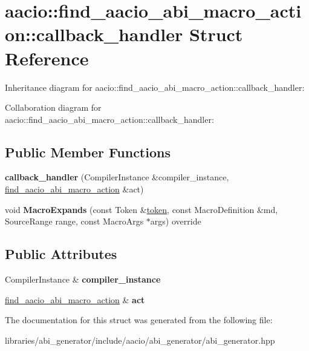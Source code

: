 \hypertarget{structaacio_1_1find__aacio__abi__macro__action_1_1callback__handler}{}\section{aacio\+:\+:find\+\_\+aacio\+\_\+abi\+\_\+macro\+\_\+action\+:\+:callback\+\_\+handler Struct Reference}
\label{structaacio_1_1find__aacio__abi__macro__action_1_1callback__handler}


Inheritance diagram for aacio\+:\+:find\+\_\+aacio\+\_\+abi\+\_\+macro\+\_\+action\+:\+:callback\+\_\+handler\+:


Collaboration diagram for aacio\+:\+:find\+\_\+aacio\+\_\+abi\+\_\+macro\+\_\+action\+:\+:callback\+\_\+handler\+:
\subsection*{Public Member Functions}
\begin{DoxyCompactItemize}
\item 
\mbox{\label{structaacio_1_1find__aacio__abi__macro__action_1_1callback__handler_aa277265ba47bdece0f978f34fe63137f}} 
{\bfseries callback\+\_\+handler} (Compiler\+Instance \&compiler\+\_\+instance, \mbox{\hyperlink{structaacio_1_1find__aacio__abi__macro__action}{find\+\_\+aacio\+\_\+abi\+\_\+macro\+\_\+action}} \&act)
\item 
\mbox{\label{structaacio_1_1find__aacio__abi__macro__action_1_1callback__handler_a462b2e4399a63fbdb8d5352dda189719}} 
void {\bfseries Macro\+Expands} (const Token \&\mbox{\hyperlink{classaacio_1_1token}{token}}, const Macro\+Definition \&md, Source\+Range range, const Macro\+Args $\ast$args) override
\end{DoxyCompactItemize}
\subsection*{Public Attributes}
\begin{DoxyCompactItemize}
\item 
\mbox{\label{structaacio_1_1find__aacio__abi__macro__action_1_1callback__handler_ad048e5c73980836490cc471702d56c02}} 
Compiler\+Instance \& {\bfseries compiler\+\_\+instance}
\item 
\mbox{\label{structaacio_1_1find__aacio__abi__macro__action_1_1callback__handler_a3b799bed89dce5f9c52693972ea62753}} 
\mbox{\hyperlink{structaacio_1_1find__aacio__abi__macro__action}{find\+\_\+aacio\+\_\+abi\+\_\+macro\+\_\+action}} \& {\bfseries act}
\end{DoxyCompactItemize}


The documentation for this struct was generated from the following file\+:\begin{DoxyCompactItemize}
\item 
libraries/abi\+\_\+generator/include/aacio/abi\+\_\+generator/abi\+\_\+generator.\+hpp\end{DoxyCompactItemize}
